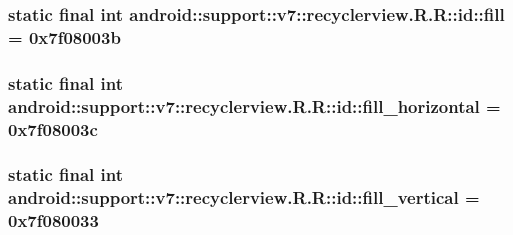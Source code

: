 \hypertarget{classandroid_1_1support_1_1v7_1_1recyclerview_1_1_r_1_1id_5e564f0e4568e88b012242af8447aaae}{
\subsubsection[{fill}]{\setlength{\rightskip}{0pt plus 5cm}static final int android::support::v7::recyclerview.R.R::id::fill = 0x7f08003b}}
\label{classandroid_1_1support_1_1v7_1_1recyclerview_1_1_r_1_1id_5e564f0e4568e88b012242af8447aaae}


\hypertarget{classandroid_1_1support_1_1v7_1_1recyclerview_1_1_r_1_1id_245b569479305f933d048ba8aa2ab21d}{
\subsubsection[{fill\_\-horizontal}]{\setlength{\rightskip}{0pt plus 5cm}static final int android::support::v7::recyclerview.R.R::id::fill\_\-horizontal = 0x7f08003c}}
\label{classandroid_1_1support_1_1v7_1_1recyclerview_1_1_r_1_1id_245b569479305f933d048ba8aa2ab21d}


\hypertarget{classandroid_1_1support_1_1v7_1_1recyclerview_1_1_r_1_1id_a8f1fb4feeac34050c68ad15cfaef3b3}{
\subsubsection[{fill\_\-vertical}]{\setlength{\rightskip}{0pt plus 5cm}static final int android::support::v7::recyclerview.R.R::id::fill\_\-vertical = 0x7f080033}}
\label{classandroid_1_1support_1_1v7_1_1recyclerview_1_1_r_1_1id_a8f1fb4feeac34050c68ad15cfaef3b3}


